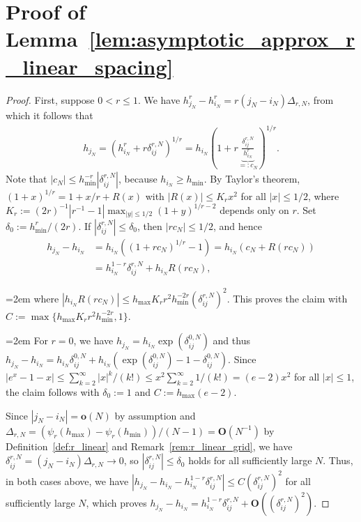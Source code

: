 \section{Proof of Lemma~\ref{lem:asymptotic_approx_r_linear_spacing}}\label{sec:proof_asymptotic_approx_r_linear_spacing}

\begin{proof}
    First, suppose $0<r\le1$. We have $h_{j_N}^r-h_{i_N}^r=r(j_N-i_N)\Delta_{r,N}$, from which it follows that
    \begin{align*}
        h_{j_N}=\left(h_{i_N}^r+r\delta_{ij}^{r,N}\right)^{1/r}=h_{i_N}\left(1+r\underbrace{\frac{\delta_{ij}^{r,N}}{h_{i_N}^r}}_{=:c_N}\right)^{1/r}.
    \end{align*}
    Note that $|c_N|\le h_{\min}^{-r}|\delta_{ij}^{r,N}|$, because $h_{i_N}\ge h_{\min}$. By Taylor's theorem, $(1+x)^{1/r}=1+x/r+R(x)$ with $|R(x)|\le K_rx^2$ for all $|x|\le1/2$, where $K_r:=(2r)^{-1}|r^{-1}-1|\max_{|y|\le1/2}(1+y)^{1/r-2}$ depends only on $r$. Set $\delta_0:=h_{\min}^r/(2r)$. If $|\delta_{ij}^{r,N}|\le\delta_0$, then $|rc_N|\le1/2$, and hence
    \begin{align*}
        h_{j_N}-h_{i_N}&=h_{i_N}\left(\left(1+rc_N\right)^{1/r}-1\right)=h_{i_N}\left(c_N+R(rc_N)\right)\\&
        =h_{i_N}^{1-r}\delta_{ij}^{r,N}+h_{i_N}R(rc_N),
    \end{align*}
    {\emergencystretch=2em\relax
    where $|h_{i_N}R(rc_N)|\le h_{\max}K_rr^2h_{\min}^{-2r}(\delta_{ij}^{r,N})^2$. This proves the claim with $C:=\max\{h_{\max}K_rr^2h_{\min}^{-2r},1\}$.
    \par
    }

    {\emergencystretch=2em\relax
    For $r=0$, we have $h_{j_N}=h_{i_N}\exp{(\delta_{ij}^{0,N})}$ and thus $h_{j_N}-h_{i_N}=h_{i_N}\delta_{ij}^{0,N}+h_{i_N}(\exp{(\delta_{ij}^{0,N})}-1-\delta_{ij}^{0,N})$. Since $|e^x-1-x|\le\sum_{k=2}^{\infty}|x|^k/(k!)\le x^2\sum_{k=2}^{\infty}1/(k!)=(e-2)x^2$ for all $|x|\le1$, the claim follows with $\delta_0:=1$ and $C:=h_{\max}(e-2)$. 
    \par
    }

    Since $|j_N-i_N|=\mathbf{o}(N)$ by assumption and $\Delta_{r,N}=(\psi_r(h_{\max})-\psi_r(h_{\min}))/(N-1)=\mathbf{O}(N^{-1})$ by Definition~\ref{def:r_linear} and Remark~\ref{rem:r_linear_grid}, we have $\delta_{ij}^{r,N}=(j_N-i_N)\Delta_{r,N}\to0$, so $|\delta_{ij}^{r,N}|\le\delta_0$ holds for all sufficiently large $N$. Thus, in both cases above, we have $|h_{j_N}-h_{i_N}-h_{i_N}^{1-r}\delta_{ij}^{r,N}|\le C(\delta_{ij}^{r,N})^2$ for all sufficiently large $N$, which proves $h_{j_N}-h_{i_N}=h_{i_N}^{1-r}\delta_{ij}^{r,N}+\mathbf{O}((\delta_{ij}^{r,N})^2)$.
\end{proof}


